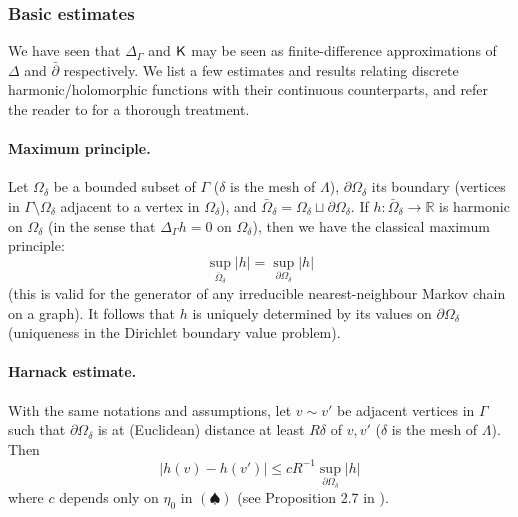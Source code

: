 \documentclass[10pt]{article}
\newcommand{\R}{\mathbb{R}}
\newcommand{\rK}{{\sf K}}
\newcommand{\Lap}{\Delta\!}
\newcommand{\dbar}{\bar\partial}
\begin{document}
\subsubsection{Basic estimates}\label{sss:basic}

We have seen that $\Lap_\Gamma$ and $\rK$ may be seen as finite-difference approximations of $\Lap$ and $\dbar$ respectively. We list a few estimates and results relating discrete harmonic/holomorphic functions with their continuous counterparts, and refer the reader to \cite{SmiChe_isoradial} for a thorough treatment.

\paragraph{Maximum principle.\\}

Let $\Omega_\delta$ be a bounded subset of $\Gamma$ ($\delta$ is the mesh of $\Lambda$), $\partial\Omega_\delta$ its boundary (vertices in $\Gamma\setminus\Omega_\delta$ adjacent to a vertex in $\Omega_\delta$), and $\bar\Omega_\delta=\Omega_\delta\sqcup\partial\Omega_\delta$. If $h:\bar\Omega_\delta\rightarrow\R$
is harmonic on $\Omega_\delta$ (in the sense that $\Lap_\Gamma h=0$ on $\Omega_\delta$), then we have the classical maximum principle:
\begin{equation}\label{eq:maxprincip}
\sup_{\bar\Omega_\delta}|h|=\sup_{\partial\Omega_\delta}|h|
\end{equation}
(this is valid for the generator of any irreducible nearest-neighbour Markov chain on a graph). It follows that $h$ is uniquely determined by its values on $\partial\Omega_\delta$ (uniqueness in the Dirichlet boundary value problem).

\paragraph{Harnack estimate.\\}

With the same notations and assumptions, let $v\sim v'$ be adjacent vertices in $\Gamma$ such that $\partial\Omega_\delta$ is at (Euclidean) distance at least $R\delta$ of $v,v'$ ($\delta$ is the mesh of $\Lambda$). Then
\begin{equation}\label{eq:harnack}
|h(v)-h(v')|\leq cR^{-1}\sup_{\partial\Omega_\delta}|h|
\end{equation}
where $c$ depends only on $\eta_0$ in $(\spadesuit)$ (see Proposition 2.7 in \cite{SmiChe_isoradial}). 
\end{document}
